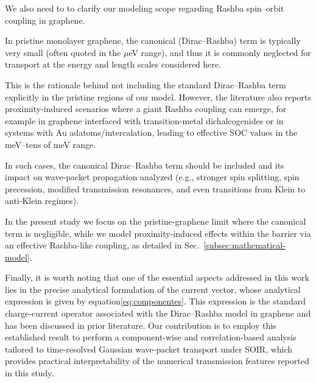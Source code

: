 We also need to to clarify our modeling scope regarding Rashba spin–orbit coupling in graphene.

In pristine monolayer graphene, the canonical (Dirac–Rashba) term is typically very small (often quoted in the $\mu$eV range), and thus it is commonly neglected for transport at the energy and length scales considered here.

This is the rationale behind not including the standard Dirac–Rashba term explicitly in the pristine regions of our model.
However, the literature also reports proximity-induced scenarios where a giant Rashba coupling can emerge, for example in graphene interfaced with transition-metal dichalcogenides or in systems with Au adatoms/intercalation, leading to effective SOC values in the meV–tens of meV range\cite{AvsarNatCommun2014, WangPhysRevX2016}.

In such cases, the canonical Dirac–Rashba term should be included and its impact on wave-packet propagation analyzed (e.g., stronger spin splitting, spin precession, modified transmission resonances, and even transitions from Klein to anti-Klein regimes).

In the present study we focus on the pristine-graphene limit where the canonical term is negligible, while we model proximity-induced effects within the barrier via an effective Rashba-like coupling, as detailed in Sec.~\ref{subsec:mathematical-model}.


Finally, it is worth noting that one of the essential aspects addressed in this work lies in the precise analytical formulation of the current vector, whose analytical expression is given by equation\eqref{eq:componentes}.
This expression is the standard charge-current operator associated with the Dirac–Rashba model in graphene and has been discussed in prior literature\cite{AvishaiPhysRevB2021}.
Our contribution is to employ this established result to perform a component-wise and correlation-based analysis tailored to time-resolved Gaussian wave-packet transport under SOIR, which provides practical interpretability of the numerical transmission features reported in this study.


%

